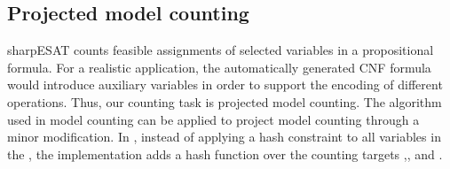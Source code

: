 \subsection{Projected model counting}
\Gls{sharpESAT} counts feasible assignments of selected variables in a
propositional formula.  For a realistic application, the automatically
generated \gls{CNF} formula would introduce auxiliary variables in
order to support the encoding of different operations. Thus, our
counting task is projected model counting. The algorithm used in model
counting can be applied to project model counting through a minor
modification. In , instead of applying a hash
constraint to all variables in the \satProp, the implementation adds a
hash function over the counting targets \ACIFn{},\AIIFn{}, and
\AOOFn{}. 


